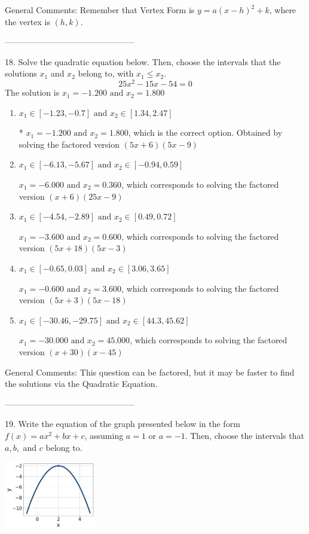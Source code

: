 \documentclass{article}[14pt]
\begin{document}
General Comments: Remember that Vertex Form is $y = a(x-h)^2+k$, where the vertex is $(h, k)$.

-----------------------------------------------

18. Solve the quadratic equation below. Then, choose the intervals that the solutions $x_1$ and $x_2$ belong to, with $x_1 \leq x_2$.
$$ 25x^{2} -15 x -54 = 0 $$ 
The solution is $ x_1 = -1.200 \text{ and } x_2 = 1.800 $ 

\begin{enumerate}[label=\Alph*.] 
\item $ x_1 \in [-1.23, -0.7] \text{ and } x_2 \in [1.34, 2.47] $ 

 * $x_1 = -1.200 \text{ and } x_2 = 1.800$, which is the correct option. Obtained by solving the factored version $(5x + 6)(5x -9)$ 
\item $ x_1 \in [-6.13, -5.67] \text{ and } x_2 \in [-0.94, 0.59] $ 

 $x_1 = -6.000 \text{ and } x_2 = 0.360$, which corresponds to solving the factored version $(x + 6)(25x -9)$ 
\item $ x_1 \in [-4.54, -2.89] \text{ and } x_2 \in [0.49, 0.72] $ 

 $x_1 = -3.600 \text{ and } x_2 = 0.600$, which corresponds to solving the factored version $(5x + 18)(5x -3)$ 
\item $ x_1 \in [-0.65, 0.03] \text{ and } x_2 \in [3.06, 3.65] $ 

 $x_1 = -0.600 \text{ and } x_2 = 3.600$, which corresponds to solving the factored version $(5x + 3)(5x -18)$ 
\item $ x_1 \in [-30.46, -29.75] \text{ and } x_2 \in [44.3, 45.62] $ 

 $x_1 = -30.000 \text{ and } x_2 = 45.000$, which corresponds to solving the factored version $(x + 30)(x -45)$ 
\end{enumerate} 
 
General Comments: This question can be factored, but it may be faster to find the solutions via the Quadratic Equation.

-----------------------------------------------

19. Write the equation of the graph presented below in the form $f(x)=ax^2+bx+c$, assuming  $a=1$ or $a=-1$. Then, choose the intervals that $a, b,$ and $c$ belong to.
\begin{center} \includegraphics[width=0.3\textwidth]{../Figures/quadraticGraphToEquationA.png} \end{center} 
\end{document}

